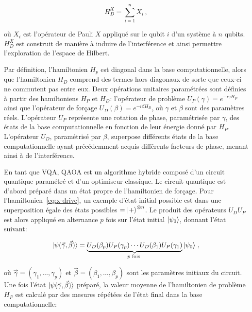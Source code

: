 \begin{equation}
    \label{eq:x-drive}
    H_{D}^{X} = \sum_{i=1}^{n} X_{i} \,,
\end{equation}

où $X_{i}$ est l'opérateur de Pauli $X$ appliqué sur le qubit $i$ d'un système à $n$ qubits. $H_{D}^{X}$ est construit de manière à induire de l'interférence et ainsi permettre l'exploration de l'espace de Hilbert. 

Par définition, l'hamiltonien $H_{p}$ est diagonal dans la base computationnelle, alors que l'hamiltonien $H_{D}$ comprend des termes hors diagonaux de sorte que ceux-ci ne commutent pas entre eux. Deux opérations unitaires paramétrées sont définies à partir des hamiltoniens $H_{P}$ et $H_{D}$: l'opérateur de problème $U_{P}(\gamma) = e^{-i \gamma H_{P}}$ ainsi que l'opérateur de forçage $U_{D}(\beta) = e^{-i \beta H_{D}}$, où $\gamma$ et $\beta$ sont des paramètres réels. L'opérateur $U_{P}$ représente une rotation de phase, paramétrisée par $\gamma$, des états de la base computationnelle en fonction de leur énergie donné par $H_{P}$. L'opérateur $U_{D}$, paramétrisé par $\beta$, superpose différents états de la base computationnelle ayant précédemment acquis différents facteurs de phase, menant ainsi à de l'interférence.

En tant que VQA, QAOA est un algorithme hybride composé d'un circuit quantique paramétré et d'un optimiseur classique. Le circuit quantique est d'abord préparé dans un état propre de l'hamiltonien de forçage. Pour l'hamiltonien~\ref{eq:x-drive}, un exemple d'état initial possible est dans une superposition égale des états possibles $= \ket{+}^{\otimes n}$. Le produit des opérateurs $U_{D}U_{P}$ est alors appliqué en alternance $p$ fois sur l'état initial $\ket{\psi_{0}}$, donnant l'état suivant:

\begin{equation}
    \label{eq:final-state}
    \ket{\psi(\vec{\gamma}, \vec{\beta})} = \underbrace{U_D(\beta_p) U_P(\gamma_p) \cdots U_D(\beta_1) U_P(\gamma_1)}_{p \text{ fois }} \ket{\psi_{0}} \,,
\end{equation}

où $\vec{\gamma} = (\gamma_{1}, \dots, \gamma_{p})$ et $\vec{\beta} = (\beta_{1}, \dots, \beta_{p})$ sont les paramètres initiaux du circuit. Une fois l'état $\ket{\psi(\vec{\gamma}, \vec{\beta})}$ préparé, la valeur moyenne de l'hamiltonien de problème $H_{P}$ est calculé par des mesures répétées de l'état final dans la base computationnelle:

